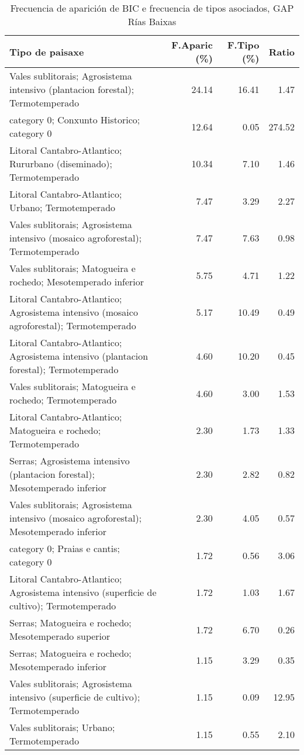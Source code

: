 \begin{table}[p]
\centering
\caption{Frecuencia de aparición de BIC e frecuencia de tipos asociados, GAP Rías Baixas} 
\label{vbic12}
\begin{tabular}{lrrr}
  \hline
Tipo de paisaxe & F.Aparic (\%) & F.Tipo (\%) & Ratio \\ 
  \hline
Vales sublitorais; Agrosistema intensivo (plantacion forestal); Termotemperado & 24.14 & 16.41 & 1.47 \\ 
  category 0; Conxunto Historico; category 0 & 12.64 & 0.05 & 274.52 \\ 
  Litoral Cantabro-Atlantico; Rururbano (diseminado); Termotemperado & 10.34 & 7.10 & 1.46 \\ 
  Litoral Cantabro-Atlantico; Urbano; Termotemperado & 7.47 & 3.29 & 2.27 \\ 
  Vales sublitorais; Agrosistema intensivo (mosaico agroforestal); Termotemperado & 7.47 & 7.63 & 0.98 \\ 
  Vales sublitorais; Matogueira e rochedo; Mesotemperado inferior & 5.75 & 4.71 & 1.22 \\ 
  Litoral Cantabro-Atlantico; Agrosistema intensivo (mosaico agroforestal); Termotemperado & 5.17 & 10.49 & 0.49 \\ 
  Litoral Cantabro-Atlantico; Agrosistema intensivo (plantacion forestal); Termotemperado & 4.60 & 10.20 & 0.45 \\ 
  Vales sublitorais; Matogueira e rochedo; Termotemperado & 4.60 & 3.00 & 1.53 \\ 
  Litoral Cantabro-Atlantico; Matogueira e rochedo; Termotemperado & 2.30 & 1.73 & 1.33 \\ 
  Serras; Agrosistema intensivo (plantacion forestal); Mesotemperado inferior & 2.30 & 2.82 & 0.82 \\ 
  Vales sublitorais; Agrosistema intensivo (mosaico agroforestal); Mesotemperado inferior & 2.30 & 4.05 & 0.57 \\ 
  category 0; Praias e cantis; category 0 & 1.72 & 0.56 & 3.06 \\ 
  Litoral Cantabro-Atlantico; Agrosistema intensivo (superficie de cultivo); Termotemperado & 1.72 & 1.03 & 1.67 \\ 
  Serras; Matogueira e rochedo; Mesotemperado superior & 1.72 & 6.70 & 0.26 \\ 
  Serras; Matogueira e rochedo; Mesotemperado inferior & 1.15 & 3.29 & 0.35 \\ 
  Vales sublitorais; Agrosistema intensivo (superficie de cultivo); Termotemperado & 1.15 & 0.09 & 12.95 \\ 
  Vales sublitorais; Urbano; Termotemperado & 1.15 & 0.55 & 2.10 \\ 
   \hline
\end{tabular}
\end{table}
